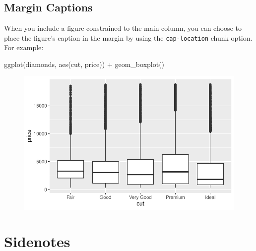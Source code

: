 \documentclass[
  letterpaper,
  DIV=11,
  numbers=noendperiod,
  oneside]{scrartcl}
\newenvironment{Shaded}{\begin{snugshade}}{\end{snugshade}}
\newcommand{\FunctionTok}[1]{\textcolor[rgb]{0.28,0.35,0.67}{#1}}
\newcommand{\NormalTok}[1]{\textcolor[rgb]{0.00,0.23,0.31}{#1}}
\newcommand{\SpecialCharTok}[1]{\textcolor[rgb]{0.37,0.37,0.37}{#1}}
\begin{document}
\hypertarget{margin-captions}{%
\subsection{Margin Captions}\label{margin-captions}}

When you include a figure constrained to the main column, you can choose
to place the figure's caption in the margin by using the
\texttt{cap-location} chunk option. For example:

\begin{Shaded}
\begin{Highlighting}[]
\FunctionTok{ggplot}\NormalTok{(diamonds, }\FunctionTok{aes}\NormalTok{(cut, price)) }\SpecialCharTok{+} \FunctionTok{geom\_boxplot}\NormalTok{()}
\end{Highlighting}
\end{Shaded}

\begin{figure}[H]


{\centering \includegraphics{cv_files/figure-pdf/fig-main-margin-cap-1.pdf}

}

\end{figure}

\hypertarget{sidenotes}{%
\section{Sidenotes}\label{sidenotes}}
\end{document}
